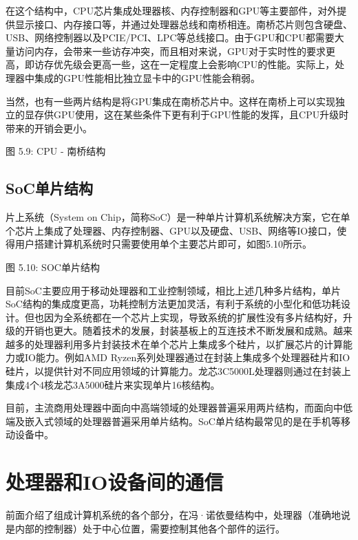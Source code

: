 \documentclass[]{ctexbook}
\begin{document}
在这个结构中，CPU芯片集成处理器核、内存控制器和GPU等主要部件，对外提供显示接口、内存接口等，并通过处理器总线和南桥相连。南桥芯片则包含硬盘、USB、网络控制器以及PCIE/PCI、LPC等总线接口。由于GPU和CPU都需要大量访问内存，会带来一些访存冲突，而且相对来说，GPU对于实时性的要求更高，即访存优先级会更高一些，这在一定程度上会影响CPU的性能。实际上，处理器中集成的GPU性能相比独立显卡中的GPU性能会稍弱。

当然，也有一些两片结构是将GPU集成在南桥芯片中。这样在南桥上可以实现独立的显存供GPU使用，这在某些条件下更有利于GPU性能的发挥，且CPU升级时带来的开销会更小。

图 5.9: CPU - 南桥结构

\hypertarget{socux5355ux7247ux7ed3ux6784}{%
\subsection{SoC单片结构}\label{socux5355ux7247ux7ed3ux6784}}

片上系统（System on Chip，简称SoC）是一种单片计算机系统解决方案，它在单个芯片上集成了处理器、内存控制器、GPU以及硬盘、USB、网络等IO接口，使得用户搭建计算机系统时只需要使用单个主要芯片即可，如图5.10所示。

图 5.10: SOC单片结构

目前SoC主要应用于移动处理器和工业控制领域，相比上述几种多片结构，单片SoC结构的集成度更高，功耗控制方法更加灵活，有利于系统的小型化和低功耗设计。但也因为全系统都在一个芯片上实现，导致系统的扩展性没有多片结构好，升级的开销也更大。随着技术的发展，封装基板上的互连技术不断发展和成熟。越来越多的处理器利用多片封装技术在单个芯片上集成多个硅片，以扩展芯片的计算能力或IO能力。例如AMD Ryzen系列处理器通过在封装上集成多个处理器硅片和IO硅片，以提供针对不同应用领域的计算能力。龙芯3C5000L处理器则通过在封装上集成4个4核龙芯3A5000硅片来实现单片16核结构。

目前，主流商用处理器中面向中高端领域的处理器普遍采用两片结构，而面向中低端及嵌入式领域的处理器普遍采用单片结构。SoC单片结构最常见的是在手机等移动设备中。

\hypertarget{ux5904ux7406ux5668ux548cioux8bbeux5907ux95f4ux7684ux901aux4fe1}{%
\section{处理器和IO设备间的通信}\label{ux5904ux7406ux5668ux548cioux8bbeux5907ux95f4ux7684ux901aux4fe1}}

前面介绍了组成计算机系统的各个部分，在冯·诺依曼结构中，处理器（准确地说是内部的控制器）处于中心位置，需要控制其他各个部件的运行。
\end{document}

